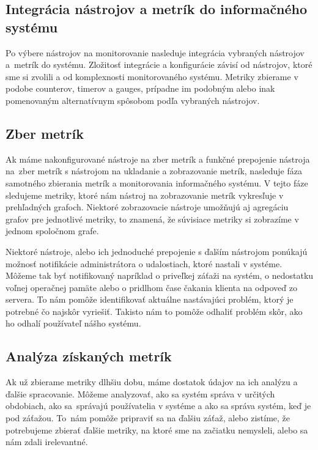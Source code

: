 \documentclass[a4paper, upjsfrontpage, disablespecwarning, thesismargins, thesislinespacing]{rnthesis}
\begin{document}
\subsection*{Integrácia nástrojov a metrík do informačného systému}

Po výbere nástrojov na monitorovanie nasleduje integrácia vybraných nástrojov a~metrík do systému.
Zložitosť integrácie a konfigurácie závisí od nástrojov, ktoré sme si zvolili a od komplexnosti monitorovaného systému.
Metriky zbierame v podobe counterov, timerov a gauges, prípadne im podobným alebo inak pomenovaným alternatívnym spôsobom podľa vybraných nástrojov.

\subsection*{Zber metrík}

Ak máme nakonfigurované nástroje na zber metrík a funkčné prepojenie nástroja na~zber metrík s nástrojom na ukladanie a zobrazovanie metrík, nasleduje fáza samotného zbierania metrík a monitorovania informačného systému.
V tejto fáze sledujeme metriky, ktoré nám nástroj na zobrazovanie metrík vykresľuje v prehľadných grafoch.
Niektoré zobrazovacie nástroje umožňujú aj agregáciu grafov pre jednotlivé metriky, to znamená, že súvisiace metriky si zobrazíme v jednom spoločnom grafe. 

Niektoré nástroje, alebo ich jednoduché prepojenie s ďalším nástrojom ponúkajú možnosť notifikácie administrátora o udalostiach, ktoré nastali v systéme.
Môžeme tak byť notifikovaný napríklad o priveľkej záťaži na systém, o nedostatku voľnej operačnej pamäte alebo o pridlhom čase čakania klienta na odpoveď zo servera.
To nám pomôže identifikovať aktuálne nastávajúci problém, ktorý je potrebné čo najskôr vyriešiť.
Takisto nám to pomôže odhaliť problém skôr, ako ho odhalí používateľ nášho systému.

\subsection*{Analýza získaných metrík}

Ak už zbierame metriky dlhšiu dobu, máme dostatok údajov na ich analýzu a ďalšie spracovanie.
Môžeme analyzovať, ako sa systém správa v určitých obdobiach, ako sa~správajú používatelia v systéme a ako sa správa systém, keď je pod záťažou. 
To~nám pomôže pripraviť sa na ďalšiu záťaž, alebo zistíme, že potrebujeme zbierať ďalšie metriky, na ktoré sme na začiatku nemysleli, alebo sa nám zdali irelevantné.
\end{document}
